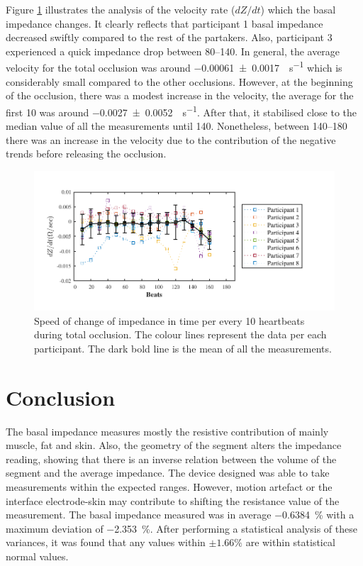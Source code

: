 Figure \ref{fig:total occlusion change} illustrates the analysis of the velocity rate ($dZ/dt$) which the basal impedance changes. It clearly reflects that participant 1 basal impedance decreased swiftly compared to the rest of the partakers. Also, participant 3 experienced a quick impedance drop between \SIrange{80}{140}{\beats}. In general, the average velocity for the total occlusion was around \SI{-0.00061(000170)}{\Omega\per\second} which is considerably small compared to the other occlusions. However, at the beginning of the occlusion, there was a modest increase in the velocity, the average for the first \SI{10}{\beats} was around \SI{-0.0027(00052)}{\Omega\per\second}. After that, it stabilised close to the median value of all the measurements until \SI{140}{\beats}. Nonetheless, between \SIrange{140}{180}{\beats} there was an increase in the velocity due to the contribution of the negative trends before releasing the occlusion. 

\begin{figure}[htbp]
	\centering
	\includegraphics[width=15cm,keepaspectratio]{figure_vop_9}    
	\caption[Rate of change of impedance per 10 heartbeats during total occlusion]{Speed of change of impedance in time per every 10 heartbeats during total occlusion. The colour lines represent the data per each participant. The dark bold line is the mean of all the measurements.}
	\label{fig:total occlusion change}
\end{figure} 

\section{Conclusion}
\label{senction basal 5} 
The basal impedance measures mostly the resistive contribution of mainly muscle, fat and skin. Also, the geometry of the segment alters the impedance reading, showing that there is an inverse relation between the volume of the segment and the average impedance. The device designed was able to take measurements within the expected ranges. However, motion artefact or the interface electrode-skin may contribute to shifting the resistance value of the measurement. The basal impedance measured was in average \SI{-0.6384}{\percent} with a maximum deviation of \SI{-2.353}{\percent}. After performing a statistical analysis of these variances, it was found that any values within $\pm 1.66 \%$ are within statistical normal values. 


